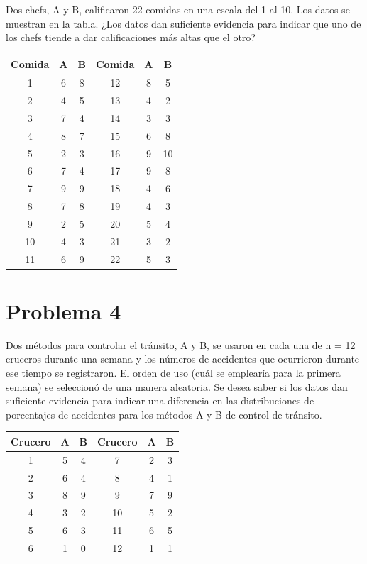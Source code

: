 \documentclass{article}
\begin{document}
Dos chefs, A y B, calificaron 22 comidas en una escala del 1 al 10. Los datos se muestran en la tabla. ¿Los datos dan suficiente evidencia para indicar que uno de los chefs tiende a dar calificaciones más altas que el otro?
\begin{center}
    \begin{tabular}{c c c| c c c}
        Comida & A & B & Comida & A & B  \\
        \hline
        1      & 6 & 8 & 12     & 8 & 5  \\
        2      & 4 & 5 & 13     & 4 & 2  \\
        3      & 7 & 4 & 14     & 3 & 3  \\
        4      & 8 & 7 & 15     & 6 & 8  \\
        5      & 2 & 3 & 16     & 9 & 10 \\
        6      & 7 & 4 & 17     & 9 & 8  \\
        7      & 9 & 9 & 18     & 4 & 6  \\
        8      & 7 & 8 & 19     & 4 & 3  \\
        9      & 2 & 5 & 20     & 5 & 4  \\
        10     & 4 & 3 & 21     & 3 & 2  \\
        11     & 6 & 9 & 22     & 5 & 3  \\
    \end{tabular}
\end{center}

\section{Problema 4}
Dos métodos para controlar el tránsito, A y B, se usaron en cada una de n = 12 cruceros durante una semana y los números de accidentes que ocurrieron durante ese tiempo se registraron. El orden de uso (cuál se emplearía para la primera semana) se seleccionó de una manera aleatoria. Se desea saber si los datos dan suficiente evidencia para indicar una diferencia en las distribuciones de porcentajes de accidentes para los métodos A y B de control de tránsito.

\begin{center}
    \begin{tabular}{c c c |c c c}
        Crucero & A & B & Crucero & A & B \\
        \hline
        1       & 5 & 4 & 7       & 2 & 3 \\
        2       & 6 & 4 & 8       & 4 & 1 \\
        3       & 8 & 9 & 9       & 7 & 9 \\
        4       & 3 & 2 & 10      & 5 & 2 \\
        5       & 6 & 3 & 11      & 6 & 5 \\
        6       & 1 & 0 & 12      & 1 & 1 \\
    \end{tabular}
\end{center}
\end{document}
